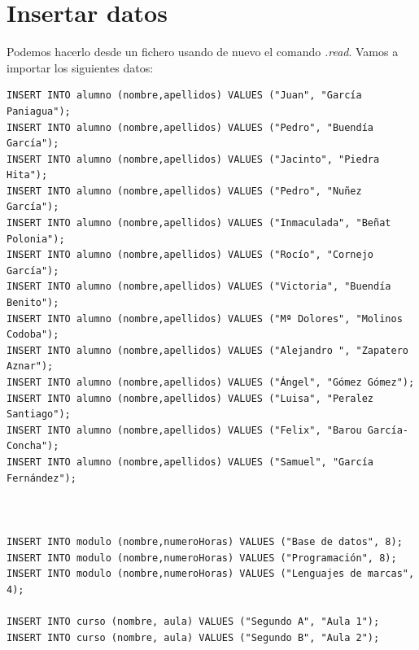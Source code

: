 \documentclass[4paper]{article}
\begin{document}
\section{Insertar datos}
Podemos hacerlo desde un fichero usando de nuevo el comando \emph{.read}. Vamos a importar los siguientes datos:
\begin{verbatim}
INSERT INTO alumno (nombre,apellidos) VALUES ("Juan", "García Paniagua");
INSERT INTO alumno (nombre,apellidos) VALUES ("Pedro", "Buendía García");
INSERT INTO alumno (nombre,apellidos) VALUES ("Jacinto", "Piedra Hita");
INSERT INTO alumno (nombre,apellidos) VALUES ("Pedro", "Nuñez García");
INSERT INTO alumno (nombre,apellidos) VALUES ("Inmaculada", "Beñat Polonia");
INSERT INTO alumno (nombre,apellidos) VALUES ("Rocío", "Cornejo García");
INSERT INTO alumno (nombre,apellidos) VALUES ("Victoria", "Buendía Benito");
INSERT INTO alumno (nombre,apellidos) VALUES ("Mª Dolores", "Molinos Codoba");
INSERT INTO alumno (nombre,apellidos) VALUES ("Alejandro ", "Zapatero Aznar");
INSERT INTO alumno (nombre,apellidos) VALUES ("Ángel", "Gómez Gómez");
INSERT INTO alumno (nombre,apellidos) VALUES ("Luisa", "Peralez Santiago");
INSERT INTO alumno (nombre,apellidos) VALUES ("Felix", "Barou García-Concha");
INSERT INTO alumno (nombre,apellidos) VALUES ("Samuel", "García Fernández");



INSERT INTO modulo (nombre,numeroHoras) VALUES ("Base de datos", 8);
INSERT INTO modulo (nombre,numeroHoras) VALUES ("Programación", 8);
INSERT INTO modulo (nombre,numeroHoras) VALUES ("Lenguajes de marcas", 4);

INSERT INTO curso (nombre, aula) VALUES ("Segundo A", "Aula 1");
INSERT INTO curso (nombre, aula) VALUES ("Segundo B", "Aula 2");


\end{verbatim}
\end{document}
